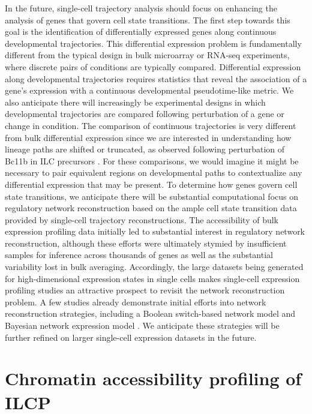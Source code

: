 In the future, single-cell trajectory analysis should focus on enhancing the analysis of genes that govern cell state transitions. The first step towards this goal is the identification of differentially expressed genes along continuous developmental trajectories. This differential expression problem is fundamentally different from the typical design in bulk microarray or RNA-seq experiments, where discrete pairs of conditions are typically compared. Differential expression along developmental trajectories requires statistics that reveal the association of a gene’s expression with a continuous developmental pseudotime-like metric. We also anticipate there will increasingly be experimental designs in which developmental trajectories are compared following perturbation of a gene or change in  condition. The comparison of continuous trajectories is very different from bulk differential expression since we are interested in understanding how lineage paths are shifted or truncated, as observed following perturbation of Bc11b in ILC precursors \cite{yu2016}. For these comparisons, we would imagine it might be necessary to pair equivalent regions on developmental paths to contextualize any differential expression that may be present. To determine how genes govern cell state transitions, we anticipate there will be substantial computational focus on regulatory network reconstruction based on the ample cell state transition data provided by single-cell trajectory reconstructions. The accessibility of bulk expression profiling data initially led to substantial interest in regulatory network reconstruction, although these efforts were ultimately stymied by insufficient samples for inference across thousands of genes as well as the substantial variability lost in bulk averaging. Accordingly, the large datasets being generated for high-dimensional expression states in single cells makes single-cell expression profiling studies an attractive prospect to revisit the network reconstruction problem. A few studies already demonstrate initial efforts into network reconstruction strategies, including a Boolean switch-based network model \cite{moignard2015} and Bayesian network expression model \cite{buganim2012}. We anticipate these strategies will be further refined on larger single-cell expression datasets in the future. 


\section{Chromatin accessibility profiling of ILCP}

